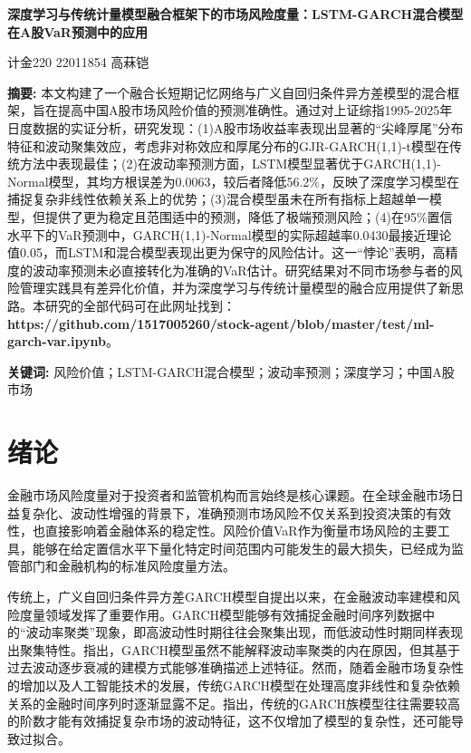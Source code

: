 \documentclass[12pt, a4paper]{article}
\begin{document}
\begin{center}
\LARGE\textbf{深度学习与传统计量模型融合框架下的市场风险度量：LSTM-GARCH混合模型在A股VaR预测中的应用}

\vspace{1cm}
\large 计金220 22011854 高菻铠
\end{center}

\noindent \textbf{摘要:} 本文构建了一个融合长短期记忆网络与广义自回归条件异方差模型的混合框架，旨在提高中国A股市场风险价值的预测准确性。通过对上证综指1995-2025年日度数据的实证分析，研究发现：(1)A股市场收益率表现出显著的“尖峰厚尾”分布特征和波动聚集效应，考虑非对称效应和厚尾分布的GJR-GARCH(1,1)-t模型在传统方法中表现最佳；(2)在波动率预测方面，LSTM模型显著优于GARCH(1,1)-Normal模型，其均方根误差为0.0063，较后者降低56.2\%，反映了深度学习模型在捕捉复杂非线性依赖关系上的优势；(3)混合模型虽未在所有指标上超越单一模型，但提供了更为稳定且范围适中的预测，降低了极端预测风险；(4)在95\%置信水平下的VaR预测中，GARCH(1,1)-Normal模型的实际超越率0.0430最接近理论值0.05，而LSTM和混合模型表现出更为保守的风险估计。这一“悖论”表明，高精度的波动率预测未必直接转化为准确的VaR估计。研究结果对不同市场参与者的风险管理实践具有差异化价值，并为深度学习与传统计量模型的融合应用提供了新思路。本研究的全部代码可在此网址找到：\textbf{https://github.com/1517005260/stock-agent/blob/master/test/ml-garch-var.ipynb}。

\noindent \textbf{关键词:} 风险价值；LSTM-GARCH混合模型；波动率预测；深度学习；中国A股市场

\section{绪论}

金融市场风险度量对于投资者和监管机构而言始终是核心课题。在全球金融市场日益复杂化、波动性增强的背景下，准确预测市场风险不仅关系到投资决策的有效性，也直接影响着金融体系的稳定性。风险价值VaR作为衡量市场风险的主要工具，能够在给定置信水平下量化特定时间范围内可能发生的最大损失，已经成为监管部门和金融机构的标准风险度量方法。

传统上，广义自回归条件异方差GARCH模型自\citet{bollerslev1986generalized}提出以来，在金融波动率建模和风险度量领域发挥了重要作用。GARCH模型能够有效捕捉金融时间序列数据中的“波动率聚类”现象，即高波动性时期往往会聚集出现，而低波动性时期同样表现出聚集特性。\citet{wang2022practical}指出，GARCH模型虽然不能解释波动率聚类的内在原因，但其基于过去波动逐步衰减的建模方式能够准确描述上述特征。然而，随着金融市场复杂性的增加以及人工智能技术的发展，传统GARCH模型在处理高度非线性和复杂依赖关系的金融时间序列时逐渐显露不足。\citet{tsay2013financial}指出，传统的GARCH族模型往往需要较高的阶数才能有效捕捉复杂市场的波动特征，这不仅增加了模型的复杂性，还可能导致过拟合。
\end{document}
